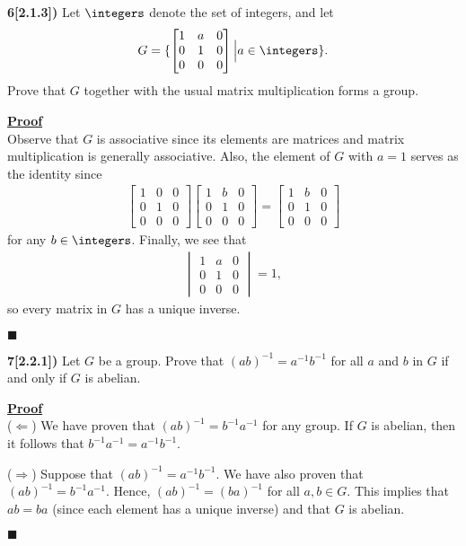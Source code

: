 \documentclass[12pt,a4paper]{article}
\newcommand{\prob}[2]{\textbf{#1)} #2}
\newenvironment{proof}
{
\textbf{\underline{Proof}} \\
}
{
\begin{flushright}
$\blacksquare$
\end{flushright}}
\begin{document}
\prob{6[2.1.3]}{Let $\integers$ denote the set of integers, and let 
\begin{align*}
G = \{\begin{bmatrix}
1 & a & 0 \\
0 & 1 & 0 \\
0 & 0 & 0
\end{bmatrix} \Big| a \in \integers\}.
\end{align*}
Prove that $G$ together with the usual matrix multiplication forms a group.}

\begin{proof}
Observe that $G$ is associative since its elements are matrices and matrix multiplication is generally associative. Also, the element of $G$ with $a = 1$ serves as the identity since
\begin{align*}
\begin{bmatrix}
1 & 0 & 0 \\
0 & 1 & 0 \\
0 & 0 & 0
\end{bmatrix}
\begin{bmatrix}
1 & b & 0 \\
0 & 1 & 0 \\
0 & 0 & 0
\end{bmatrix}
=
\begin{bmatrix}
1 & b & 0 \\
0 & 1 & 0 \\
0 & 0 & 0
\end{bmatrix}
\end{align*}
for any $b \in \integers$. Finally, we see that 
\begin{align*}
\begin{vmatrix}
1 & a & 0 \\
0 & 1 & 0 \\
0 & 0 & 0
\end{vmatrix}
= 1,
\end{align*}
so every matrix in $G$ has a unique inverse.
\end{proof}

\prob{7[2.2.1]}{Let $G$ be a group. Prove that $(ab)^{-1} = a^{-1}b^{-1}$ for all $a$ and $b$ in $G$ if and only if $G$ is abelian.}

\begin{proof}
($\Leftarrow$) We have proven that $(ab)^{-1} = b^{-1}a^{-1}$ for any group. If $G$ is abelian, then it follows that $b^{-1}a^{-1} = a^{-1}b^{-1}$.

($\Rightarrow$) Suppose that $(ab)^{-1} = a^{-1}b^{-1}$. We have also proven that $(ab)^{-1} = b^{-1}a^{-1}$. Hence, $(ab)^{-1} = (ba)^{-1}$ for all $a,b \in G$. This implies that $ab = ba$ (since each element has a unique inverse) and that $G$ is abelian.
\end{proof}
\end{document}
